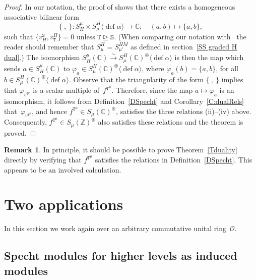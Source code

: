 \documentclass[twoside,11pt,reqno]{amsart}
\numberwithin{equation}{section}
\newtheorem{Corollary}[equation]{Corollary}
\theoremstyle{definition}  %
\newtheorem{Remark}[equation]{Remark}
\let\<\langle
\let\>\rangle
\DeclareMathOperator\gedom{\trianglerighteq}
\def\bijection{\overset{\sim}{\longrightarrow}}
\newcommand{\Stab}{\operatorname{Stab}}
\newcommand{\Z}{\mathbb{Z}}
\newcommand{\0}{{\bar 0}}
\newcommand{\1}{{\bar 1}}
\newcommand{\al}{\alpha}
\newcommand{\C}{{\mathbb C}}
\newcommand\Par[1][]{{\mathscr P}^{\kappa#1}}
\def\T{{\mathtt T}}
\def\Stab{{\mathtt S}}
\def\defect{\operatorname{def}}
\renewcommand\O{\mathcal O}
\begin{document}
\begin{proof}
  In our notation, the proof of \cite[Proposition~6.19]{HM} shows that there exists a homogeneous associative
  bilinear form
  $$\{\ ,\ \}:S^\mu_H\times S_\mu^H\<\defect\al\>\longrightarrow\C;\quad (a,b)\mapsto\{a,b\},$$
  such that $\{v_H^\Stab,v^H_\T\}=0$ unless $\T\gedom\Stab$. (When comparing our notation with~\cite{HM} the reader
  should remember that $S_\mu^H=S_{\mu'}^{HM}$ as defined in section~\ref{SS graded H dual}.) The isomorphism
  $S^\mu_H(\C)\bijection S_\mu^H(\C)^\circledast\<\defect\al\>$ is then the map which sends $a\in S^\mu_H(\C)$
  to $\varphi_a\in S_\mu^H(\C)^\circledast\<\defect\al\>$, where $\varphi_a(b)=\{a,b\}$, for all
  $b\in  S_\mu^H(\C)^\circledast\<\defect\al\>$. Observe that the triangularity of the form $\{\ ,\
  \}$ implies that $\varphi_{v^{\T^\mu}}$ is a scalar multiple of~$f^{\T^\mu}$. Therefore, since the
  map $a\mapsto\varphi_a$ is an isomorphism, it follows from Definition~\ref{DSpecht} and
  Corollary~\ref{C:dualRels} that~$\varphi_{v^{\T^\mu}}$, and hence $f^{\T^\mu}\in S_\mu(\C)^\circledast$, 
  satisfies the 
  three relations (ii)--(iv) above. Consequently,  $f^{\T^\mu}\in S_\mu(\Z)^\circledast$ also satisfies these 
  relations and the theorem is proved.
\end{proof}

\begin{Remark}
  In principle, it should be possible to prove Theorem~\ref{Tduality} directly by verifying that $f^{\T^\mu}$
  satisfies the relations in Definition~\ref{DSpecht}. This appears to be an involved calculation.
\end{Remark}

%

\section{Two applications}\label{SApp}

In this section we work again over an arbitrary commutative unital ring~$\O$. 

\subsection{Specht modules for higher levels as induced modules}
\end{document}
